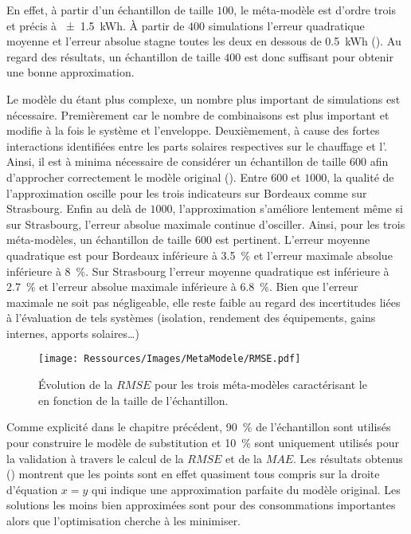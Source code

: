 En effet, à partir d’un échantillon de taille $100$, le méta-modèle est d’ordre trois et précis à
\SI{+- 1.5}{kWh}. À partir de $400$ simulations l’erreur quadratique moyenne et l’erreur
absolue stagne toutes les deux en dessous de \SI{0.5}{kWh} ().
Au regard des résultats, un échantillon de taille $400$ est donc suffisant pour obtenir
une bonne approximation.

Le modèle du  étant plus complexe, un nombre plus important de simulations est
nécessaire. Premièrement car le nombre de combinaisons est plus important et modifie à la
fois le système et l’enveloppe. Deuxièmement, à cause des fortes interactions identifiées
entre les parts solaires respectives sur le chauffage et l’. Ainsi, il est à
minima nécessaire de considérer un échantillon de taille $600$ afin d’approcher
correctement le modèle original (). Entre $600$ et $1000$, la qualité
de l’approximation oscille pour les trois indicateurs sur Bordeaux comme sur Strasbourg.
Enfin au delà de $1000$, l’approximation s’améliore lentement même si sur Strasbourg,
l’erreur absolue maximale continue d’osciller.
Ainsi, pour les trois méta-modèles, un échantillon de taille $600$ est pertinent.
L’erreur moyenne quadratique est pour Bordeaux inférieure à \SI{3.5}{\percent} et
l’erreur maximale absolue inférieure à \SI{8}{\percent}.
Sur Strasbourg l’erreur moyenne quadratique est inférieure à \SI{2.7}{\percent} et
l’erreur absolue maximale inférieure à \SI{6.8}{\percent}.
Bien que l’erreur maximale ne soit pas négligeable, elle reste faible au regard
des incertitudes liées à l’évaluation de tels systèmes (isolation, rendement des équipements,
gains internes, apports solaires\dots)

\begin{figure}
    \centering
    \texttt{[image: Ressources/Images/MetaModele/RMSE.pdf]}
    \caption[Évolution de la $RMSE$ sur le  en fonction de l’échantillon]
            {Évolution de la $RMSE$ pour les trois méta-modèles caractérisant le 
             en fonction de la taille de l’échantillon.}
    \label{fig:rmse_mae}
\end{figure}

Comme explicité dans le chapitre précédent, \SI{90}{\percent} de l’échantillon sont utilisés
pour construire le modèle de substitution et \SI{10}{\percent} sont uniquement
utilisés pour la validation à travers le calcul de la $RMSE$ et de la $MAE$.
Les résultats obtenus () montrent que les points sont en
effet quasiment tous compris sur la droite d’équation $x = y$ qui indique une approximation
parfaite du modèle original. Les solutions les moins bien approximées sont pour des
consommations importantes alors que l’optimisation cherche à les minimiser.

